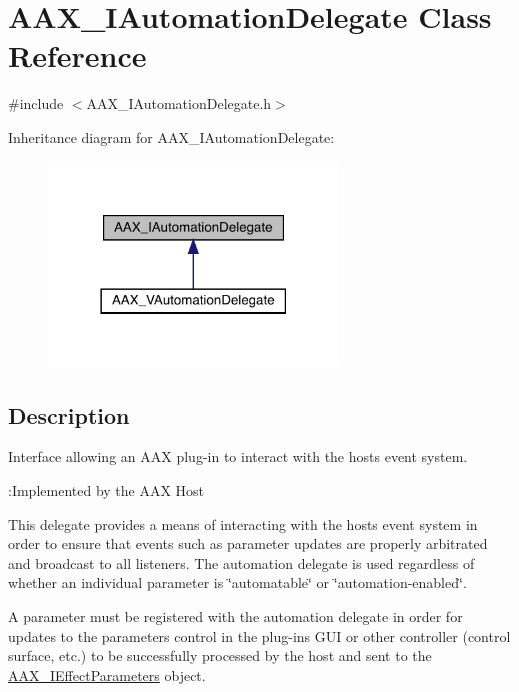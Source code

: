 \hypertarget{a01773}{}\section{A\+A\+X\+\_\+\+I\+Automation\+Delegate Class Reference}
\label{a01773}


{\ttfamily \#include $<$A\+A\+X\+\_\+\+I\+Automation\+Delegate.\+h$>$}



Inheritance diagram for A\+A\+X\+\_\+\+I\+Automation\+Delegate\+:
\nopagebreak
\begin{figure}[H]
\begin{center}
\leavevmode
\includegraphics[width=218pt]{a01772}
\end{center}
\end{figure}


\subsection{Description}
Interface allowing an A\+AX plug-\/in to interact with the host\textquotesingle{}s event system. 

\begin{DoxyRefDesc}{\+:\+Implemented by the A\+A\+X Host}
\item[\mbox{\hyperlink{a00790__aax_host_implementation000001}{\+:\+Implemented by the A\+A\+X Host}}]\end{DoxyRefDesc}


This delegate provides a means of interacting with the host\textquotesingle{}s event system in order to ensure that events such as parameter updates are properly arbitrated and broadcast to all listeners. The automation delegate is used regardless of whether an individual parameter is \char`\"{}automatable\char`\"{} or \char`\"{}automation-\/enabled\char`\"{}.

A parameter must be registered with the automation delegate in order for updates to the parameter\textquotesingle{}s control in the plug-\/in\textquotesingle{}s G\+UI or other controller (control surface, etc.) to be successfully processed by the host and sent to the \mbox{\hyperlink{a01825}{A\+A\+X\+\_\+\+I\+Effect\+Parameters}} object.

